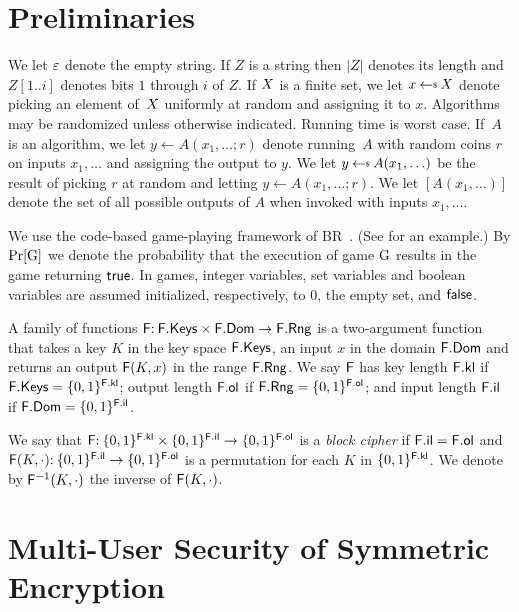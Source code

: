 
\section{Preliminaries}\label{sec-defs}


We let $\varepsilon$ denote the empty string. If $Z$ is a string then $|Z|$ denotes its length and $Z[1..i]$ denotes bits $1$ through $i$ of $Z$. If $X$ is a finite set, we let $x \getsr \setX$ denote picking an element of~$X$ uniformly at random and assigning it to $x$.
Algorithms may be randomized unless otherwise indicated. Running time is worst case.
If~$A$ is an algorithm, we let $y \gets A(x_1,\ldots;r)$ denote running~$A$ with random coins $r$ on inputs $x_1,\ldots$ and assigning the output to $y$.
We let $y \getsr A(x_1,\ldots)$ be the result of picking $r$ at random and letting $y \gets A(x_1,\ldots;r)$. We let $[A(x_1,\ldots)]$ denote the set of all possible outputs of $A$ when invoked with inputs $x_1,\ldots$.

We use the code-based game-playing framework of BR~\cite{EC:BelRog06}. (See  for an example.) By $\Pr[\mathrm{G}]$ we denote the probability that the execution of game $\mathrm{G}$ results in the game returning $\mathsf{true}$. In games, integer variables, set variables and boolean variables are assumed initialized, respectively, to $0$, the empty set, and $\mathsf{false}$.

A family of functions $\mathsf{F} {:\:} \mathsf{F}.\mathsf{Keys} \times \mathsf{F}.\mathsf{Dom}\to \mathsf{F}.\mathsf{Rng}$ is a two-argument function that takes a key $K$ in the key space $\mathsf{F}.\mathsf{Keys}$, an input $x$ in the domain $\mathsf{F}.\mathsf{Dom}$ and returns an output $\mathsf{F}(K,x)$ in the range $\mathsf{F}.\mathsf{Rng}$. We say $\mathsf{F}$ has key length $\mathsf{F}.\mathsf{kl}$ if
$\mathsf{F}.\mathsf{Keys}=\{0,1\}^{\mathsf{F}.\mathsf{kl}}$; output length $\mathsf{F}.\mathsf{ol}$ if $\mathsf{F}.\mathsf{Rng}=\{0,1\}^{\mathsf{F}.\mathsf{ol}}$; and input length $\mathsf{F}.\mathsf{il}$ if $\mathsf{F}.\mathsf{Dom}=\{0,1\}^{\mathsf{F}.\mathsf{il}}$.

We say that $\mathsf{F}{:\:} \{0,1\}^{\mathsf{F}.\mathsf{kl}}\times \{0,1\}^{\mathsf{F}.\mathsf{il}}\to\{0,1\}^{\mathsf{F}.\mathsf{ol}}$ is a \emph{block cipher} if $\mathsf{F}.\mathsf{il}=\mathsf{F}.\mathsf{ol}$ and $\mathsf{F}(K,\cdot) {:\:} \{0,1\}^{\mathsf{F}.\mathsf{il}}\to\{0,1\}^{\mathsf{F}.\mathsf{ol}}$ is a permutation for each $K$ in $\{0,1\}^{\mathsf{F}.\mathsf{kl}}$. We denote by $\mathsf{F}^{-1}(K,\cdot)$ the inverse of $\mathsf{F}(K,\cdot)$.






\section{Multi-User Security of Symmetric Encryption}\label{sec-mu-defs}

